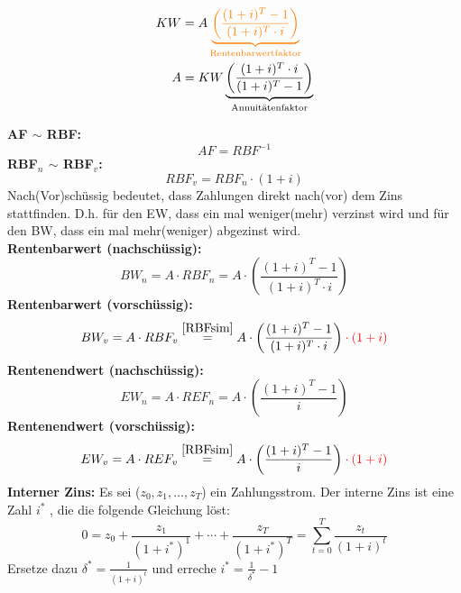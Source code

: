 \documentclass[leqno]{scrartcl}
\begin{document}
\begin{multicols}{3}
\begin{equation*}
\begin{split}
      KW &= A\color{orange} \underbrace{\left(\frac{(1+i)^T-1}{(1+i)^T \cdot i}\right)}_\text{Rentenbarwertfaktor}\\
      A  &= KW \underbrace{\left(\frac{(1+i)^T \cdot i}{(1+i)^T-1}\right)}_\text{Annuitätenfaktor}\\
    \end{split}
  \end{equation*}
\begin{center}
\end{center}
\textbf{AF $\sim$ RBF:}
  \begin{equation}
    AF = RBF^{-1}
  \end{equation}
\textbf{RBF$_n$ $\sim$ RBF$_v$:}
  \begin{equation}\label{RBFsim}
    RBF_v = RBF_n \cdot (1+i)
  \end{equation}
Nach(Vor)schüssig bedeutet, dass Zahlungen direkt nach(vor) dem Zins 
stattfinden. D.h. für den EW, dass ein mal weniger(mehr) verzinst wird und für 
den BW, dass ein mal mehr(weniger) abgezinst wird.\\
\textbf{Rentenbarwert (nachschüssig):}
  \begin{equation}
    BW_n = A \cdot RBF_n = A \cdot \left(\frac{(1+i)^T - 1}{(1+i)^T \cdot i}\right)
  \end{equation}
\textbf{Rentenbarwert (vorschüssig):}
  \begin{equation}
    BW_v = A \cdot RBF_v \overset{\ref{RBFsim}}{=} A \cdot \left(\frac{(1+i)^T - 1}{(1+i)^T \cdot i}\right)\color{red} \cdot (1+i) 
  \end{equation}
\textbf{Rentenendwert (nachschüssig):}
  \begin{equation}
    EW_n = A \cdot REF_n = A \cdot \left(\frac{(1+i)^T - 1}{i}\right)
  \end{equation}
\textbf{Rentenendwert (vorschüssig):}
  \begin{equation}
    EW_v = A \cdot REF_v \overset{\ref{RBFsim}}{=} A \cdot \left(\frac{(1+i)^T - 1}{i}\right)\color{red} \cdot (1+i)
  \end{equation}
\textbf{Interner Zins:}
  Es sei ($z_0, z_1, \dots, z_T$) ein Zahlungsstrom. Der interne Zins ist eine Zahl $i^*$ , die 
  die folgende Gleichung löst:
  $$0 = z_0 + \frac{z_1}{(1+i^*)^1} + \cdots + \frac{z_T}{(1+i^*)^T} = \sum^T_{t=0}\frac{z_t}{(1+i)^t}$$
  Ersetze dazu $\delta^* = \frac{1}{(1+i)^t}$ und erreche $i^* = \frac{1}{\delta^*}-1$


\end{multicols}
\end{document}
